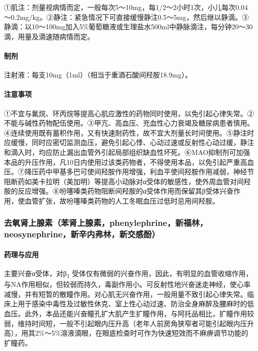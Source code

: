①肌注：剂量视病情而定，一般每次5～10mg，每1/2～2小时1次，小儿每次0.04～0.2mg/kg。②静注：紧急情况下可直接缓慢静注0.5～5mg，然后继以静滴。③静滴：以10～100mg加入5\%葡萄糖液或生理盐水500ml中静脉滴注，每分钟20～30滴，用量及滴速随病情而定。

\paragraph{制剂}

注射液：每支10mg（1ml）（相当于重酒石酸间羟胺18.9mg）。

\paragraph{注意事项}

①不宜与氟烷、环丙烷等提高心肌应激性的药物同时使用，以免引起心律失常。②不能与碱性药物配伍使用。③甲亢、高血压、充血性心力衰竭及糖尿病患者慎用。④连续使用既有蓄积作用，又有快速耐药性，故不宜大剂量长时间使用。⑤静注时应缓慢，同时应密切监测血压，避免引起心悸、心动过速或反射性心动过缓，静注和滴入时，均应防止漏出血管外引起局部组织缺血性坏死。⑥MAO抑制剂可加强本品的升压作用，凡10日内使用过该类药物者，不得使用本品，以免引起严重高血压。⑦降压药中甲基多巴可使间羟胺作用增强，利血平使间羟胺作用减弱，神经节阻断药如美卡拉明（美加明）等提高小动脉对α受体的敏感性，使外周血管对间羟胺的反应增强。⑧吩噻嗪类药物阻断间羟胺的α受体作用而保留其β受体兴奋作用，使血管扩张，故吩噻嗪类药物的人工冬眠血压过低时忌用间羟胺。

\subsubsection{去氧肾上腺素（苯肾上腺素，phenylephrine，新福林，neosynephrine，新辛内弗林，新交感酚）}

\paragraph{药理与应用}

主要兴奋α受体，对β\textsubscript{1}
受体仅有微弱的兴奋作用，因此，有明显的血管收缩作用，与NA作用相似，但较弱而持久，毒副作用小。可反射性地兴奋迷走神经，使心率减慢，并有短暂的散瞳作用。对心肌无兴奋作用，一般用量不致引起心律失常。临床上用于感染中毒性及过敏性休克、室上性心动过速、防治全身麻醉及腰麻时的低血压。此外，本品还能兴奋瞳孔扩大肌产生扩瞳作用，与阿托品相比，扩瞳作用较弱，维持时间短，一般不引起眼内压升高（老年人前房角狭窄者可能引起眼内压升高），用其2\%～5\%溶液滴眼，在眼底检查时可作为快速短效而不麻痹调节功能的扩瞳药。

